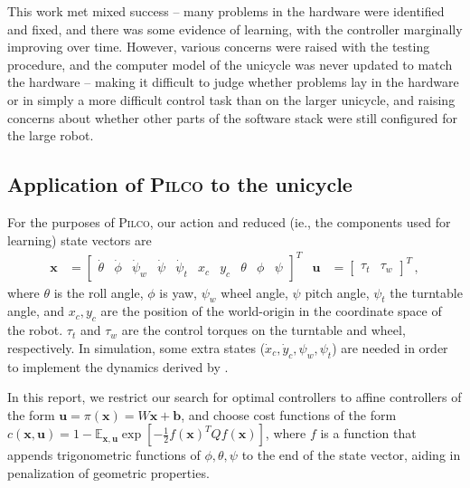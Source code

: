\documentclass[main.tex]{subfiles}
\begin{document}
	This work met mixed success -- many problems in the hardware were identified and fixed, and there was some evidence of learning, with the controller marginally improving over time.
	However, various concerns were raised with the testing procedure, and the computer model of the unicycle was never updated to match the hardware -- making it difficult to judge whether problems lay in the hardware or in simply a more difficult control task than on the larger unicycle, and raising concerns about whether other parts of the software stack were still configured for the large robot.

	\subsection{Application of \textsc{Pilco} to the unicycle}
		For the purposes of \textsc{Pilco}, our action and reduced (ie., the components used for learning) state vectors are
		\begin{align}
			\bm{x} &= \begin{bmatrix}
				\dot\theta & \dot\phi &\dot\psi_w & \dot\psi & \dot\psi_t &
				x_c & y_c &
				\theta &
				\phi & \psi
			\end{bmatrix}^T &
			\bm{u} &= \begin{bmatrix}
				\tau_t & \tau_w
			\end{bmatrix}^T\,, \label{eq:state-vars}
		\end{align}
		where $\theta$ is the roll angle, $\phi$ is yaw, $\psi_w$ wheel angle,
		$\psi$ pitch angle, $\psi_t$ the turntable angle, and $x_c, y_c$ are the position of the world-origin in the coordinate space of the robot.
		$\tau_t$ and $\tau_w$ are the control torques on the turntable and wheel, respectively.
		In simulation, some extra states ($\dot{x}_c, \dot{y}_c, \psi_w, \psi_t$) are needed in order to implement the dynamics derived by \citeauthor{forster} \cite{forster}.

		In this report, we restrict our search for optimal controllers to affine controllers of the form
		$\bm{u} = \pi(\bm{x}) = W\bm{x} + \bm{b}$, and choose cost functions of the form
		$c(\bm{x}, \bm{u}) = 1 - \mathbb{E}_{\bm{x}, \bm{u}} \exp\left[-\frac{1}{2} f(\bm{x})^T Q f(\bm{x})\right]$, where $f$ is a function that appends trigonometric functions of $\phi, \theta, \psi$ to the end of the state vector, aiding in penalization of geometric properties.
\end{document}
